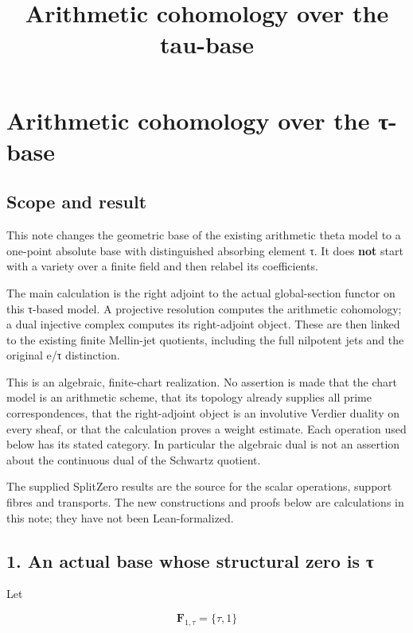 \documentclass[
]{article}
\title{Arithmetic cohomology over the tau-base}
\author{}
\date{}
\begin{document}
\maketitle

\section{Arithmetic cohomology over the
τ-base}\label{arithmetic-cohomology-over-the-ux3c4-base}

\subsection{Scope and result}\label{scope-and-result}

This note changes the geometric base of the existing arithmetic theta
model to a one-point absolute base with distinguished absorbing element
τ. It does \textbf{not} start with a variety over a finite field and
then relabel its coefficients.

The main calculation is the right adjoint to the actual global-section
functor on this τ-based model. A projective resolution computes the
arithmetic cohomology; a dual injective complex computes its
right-adjoint object. These are then linked to the existing finite
Mellin-jet quotients, including the full nilpotent jets and the original
e/τ distinction.

This is an algebraic, finite-chart realization. No assertion is made
that the chart model is an arithmetic scheme, that its topology already
supplies all prime correspondences, that the right-adjoint object is an
involutive Verdier duality on every sheaf, or that the calculation
proves a weight estimate. Each operation used below has its stated
category. In particular the algebraic dual is not an assertion about the
continuous dual of the Schwartz quotient.

The supplied SplitZero results are the source for the scalar operations,
support fibres and transports. The new constructions and proofs below
are calculations in this note; they have not been Lean-formalized.

\subsection{1. An actual base whose structural zero is
τ}\label{an-actual-base-whose-structural-zero-is-ux3c4}

Let

\[
\mathbf F_{1,\tau}=\{\tau,1\}
\]
\end{document}
